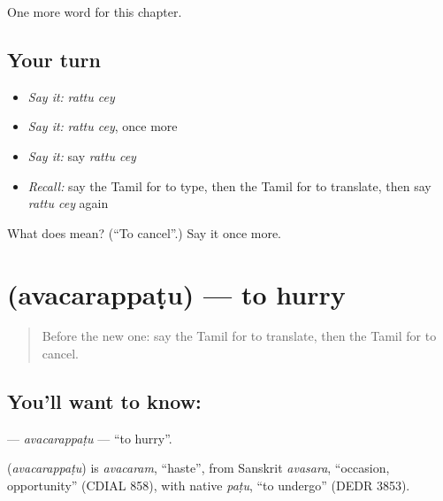 \begin{grammarlens}[title={What you've built}]
One more word for this chapter.
\end{grammarlens}

\subsection*{Your turn}
\begin{itemize}
\raggedright
  \item \emph{Say it:} \emph{rattu cey}
  \item \emph{Say it:} \emph{rattu cey}, once more
  \item \emph{Say it:} say \emph{rattu cey}
  \item \emph{Recall:} say the Tamil for to type, then the Tamil for to translate, then say \emph{rattu cey} again
\end{itemize}

\begin{tcolorbox}[breakable,colback=teal!4,colframe=teal!35!black,title={Before you move on}]
What does   mean? (\textquotedblleft{}To cancel\textquotedblright{}.) Say it once more.
\end{tcolorbox}
\section[\texorpdfstring{\ta{அவசரப்படு} (avacarappaṭu)}{அவசரப்படு (avacarappaṭu)}]{ (avacarappaṭu) — to hurry}

\label{lesson:TA-C228-avacarappatu}



\begin{quote}
Before the new one: say the Tamil for to translate, then the Tamil for to cancel.
\end{quote}

\subsection*{You'll want to know: }
\textbf{} — \emph{avacarappaṭu} — \textquotedblleft{}to hurry\textquotedblright{}.

\begin{cousinweb}
\textbf{} (\emph{avacarappaṭu}) is \emph{avacaram}, \textquotedblleft{}haste\textquotedblright{}, from Sanskrit \emph{avasara}, \textquotedblleft{}occasion, opportunity\textquotedblright{} (CDIAL 858), with native \emph{paṭu}, \textquotedblleft{}to undergo\textquotedblright{} (DEDR 3853).
\end{cousinweb}

